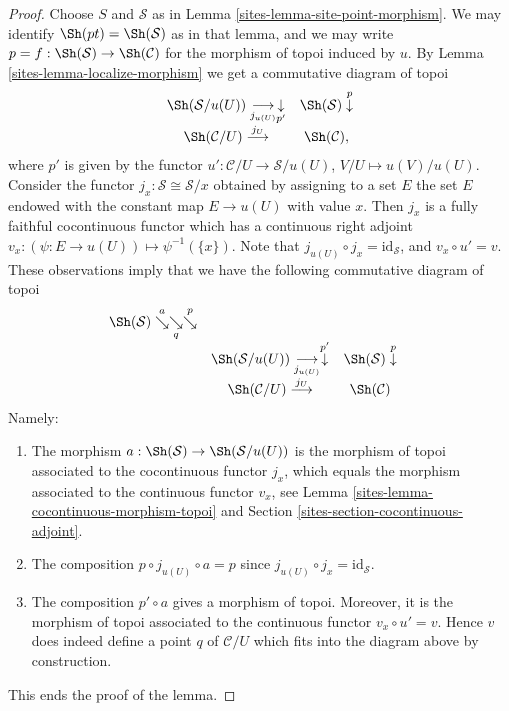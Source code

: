 \begin{proof}

Choose $S$ and $\mathcal{S}$ as in
Lemma \ref{sites-lemma-site-point-morphism}.
We may identify $\Sh(pt) = \Sh(\mathcal{S})$
as in that lemma, and we may write
$p = f : \Sh(\mathcal{S}) \to \Sh(\mathcal{C})$
for the morphism of topoi induced by $u$.
By
Lemma \ref{sites-lemma-localize-morphism}
we get a commutative diagram of topoi
$$
\begin{array}{cc}\Sh(\mathcal{S}/u(U)) \underset{j_{u(U)}}{\longrightarrow}\underset{p'}{\downarrow} & \Sh(\mathcal{S}) \overset{p}{\downarrow} \\ \Sh(\mathcal{C}/U) \overset{j_U}{\longrightarrow} & \Sh(\mathcal{C}),\end{array}
$$
where $p'$ is given by the functor $u' : \mathcal{C}/U \to \mathcal{S}/u(U)$,
$V/U \mapsto u(V)/u(U)$.
Consider the functor $j_x : \mathcal{S} \cong \mathcal{S}/x$ obtained
by assigning to a set $E$ the set $E$ endowed with the constant map
$E \to u(U)$ with value $x$.
Then $j_x$ is a fully faithful cocontinuous functor which has a
continuous right adjoint
$v_x : (\psi : E \to u(U)) \mapsto \psi^{-1}(\{x\})$.
Note that $j_{u(U)} \circ j_x = \text{id}_\mathcal{S}$, and
$v_x \circ u' = v$.
These observations imply that we have the following commutative
diagram of topoi
$$
\begin{array}{cccc}\Sh(\mathcal{S}) \overset{a}{\searrow}\underset{q}{\searrow}\overset{p}{\searrow} &  &  &  \\  & \Sh(\mathcal{S}/u(U)) \underset{j_{u(U)}}{\longrightarrow}\overset{p'}{\downarrow} & \Sh(\mathcal{S}) \overset{p}{\downarrow} &  \\  & \Sh(\mathcal{C}/U) \overset{j_U}{\longrightarrow} & \Sh(\mathcal{C}) & \end{array}
$$
Namely:
\begin{enumerate}
\item The morphism
$a : \Sh(\mathcal{S}) \to \Sh(\mathcal{S}/u(U))$
is the morphism of topoi associated to the cocontinuous functor
$j_x$, which equals the morphism associated to the continuous
functor $v_x$, see
Lemma \ref{sites-lemma-cocontinuous-morphism-topoi}
and
Section \ref{sites-section-cocontinuous-adjoint}.
\item The composition $p \circ j_{u(U)} \circ a = p$ since
$j_{u(U)} \circ j_x = \text{id}_\mathcal{S}$.
\item The composition $p' \circ a$ gives a morphism of topoi.
Moreover, it is the morphism of topoi associated to the continuous
functor $v_x \circ u' = v$. Hence $v$ does indeed define a point $q$ of
$\mathcal{C}/U$ which fits into the diagram above by construction.
\end{enumerate}
This ends the proof of the lemma.
\end{proof}

